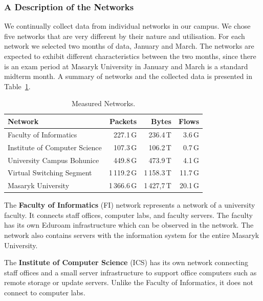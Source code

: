 \subsubsection{A Description of the Networks}

We continually collect data from individual networks in our campus. We chose five networks that are very different by their nature and utilisation. For each network we selected two months of data, January and March. The networks are expected to exhibit different characteristics between the two months, since there is an exam period at Masaryk University in January and March is a standard midterm month. A summary of networks and the collected data is presented in Table~\ref{tab:characterization-measured-networks}.

\begin{table}[!t]
        \centering
        \renewcommand{\arraystretch}{1.1}
        \begin{tabular}{|l|r|r|r|} \hline
            \textbf{Network} & \textbf{Packets} & \textbf{Bytes} & \textbf{Flows} \\ \hline
            Faculty of Informatics & 227.1\,G & 236.4\,T & 3.6\,G \\ \hline
            Institute of Computer Science & 107.3\,G & 106.2\,T & 0.7\,G \\ \hline
            University Campus Bohunice & 449.8\,G & 473.9\,T & 4.1\,G \\ \hline
            Virtual Switching Segment & 1\,119.2\,G & 1\,158.3\,T & 11.7\,G \\ \hline
            Masaryk University & 1\,366.6\,G & 1\,427,7\,T & 20.1\,G \\ \hline
        \end{tabular}
        \caption{Measured Networks.}
        \label{tab:characterization-measured-networks}
\end{table}

The \textbf{Faculty of Informatics} (FI) network represents a network of a university faculty. It connects staff offices, computer labs, and faculty servers. The faculty has its own Eduroam infrastructure which can be observed in the network. The network also contains servers with the information system for the entire Masaryk University.

The \textbf{Institute of Computer Science} (ICS) has its own network connecting staff offices and a small server infrastructure to support office computers such as remote storage or update servers. Unlike the Faculty of Informatics, it does not connect to computer labs. 

